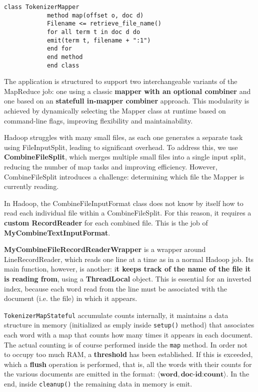 \vspace{-1em}
\begin{center}
	\begin{minipage}{\linewidth}
		\begin{lstlisting}[language=PseudoCode]
			class TokenizerMapper
			method map(offset o, doc d)
			Filename <= retrieve_file_name()
			for all term t in doc d do
			emit(term t, filename + ":1")
			end for
			end method
			end class
		\end{lstlisting}
		\label{fig:pseudocode-stateless-mapper}
	\end{minipage}
\end{center}

\columnbreak

The application is structured to support two interchangeable variants of the MapReduce job: one using a classic \textbf{mapper with an optional combiner} and one based on an \textbf{statefull in-mapper combiner} approach. This modularity is achieved by dynamically selecting the Mapper class at runtime based on command-line flags, improving flexibility and maintainability. 

Hadoop struggles with many small files, as each one generates a separate task using FileInputSplit, leading to significant overhead. To address this, we use \textbf{CombineFileSplit}, which merges multiple small files into a single input split, reducing the number of map tasks and improving efficiency. However, CombineFileSplit introduces a challenge: determining which file the Mapper is currently reading.  

In Hadoop, the CombineFileInputFormat class does not know by itself how to read each individual file within a CombineFileSplit. For this reason, it requires a \textbf{custom RecordReader} for each combined file. This is the job of \textbf{MyCombineTextInputFormat}.

\textbf{MyCombineFileRecordReaderWrapper} is a wrapper around LineRecordReader, which reads one line at a time as in a normal Hadoop job. Its main function, however, is another: i\textbf{t keeps track of the name of the file it is reading from}, using a \textbf{ThreadLocal} object. This is essential for an inverted index, because each word read from the line must be associated with the document (i.e. the file) in which it appears. 

\texttt{TokenizerMapStateful} accumulate counts internally, it maintains a data structure in memory (initialized as emply inside \texttt{setup()} method) that associates each word with a map that counts how many times it appears in each document. The actual counting is of course performed inside the \texttt{map} method. In order not to occupy too much RAM, a \textbf{threshold} has been established. If this is exceeded, which a \textbf{flush} operation is performed, that is, all the words with their counts for the various documents are emitted in the format: $ \langle \textbf{word}, \textbf{doc-id:count} \rangle $. In the end, inside \texttt{cleanup()} the remaining data in memory is emit.

